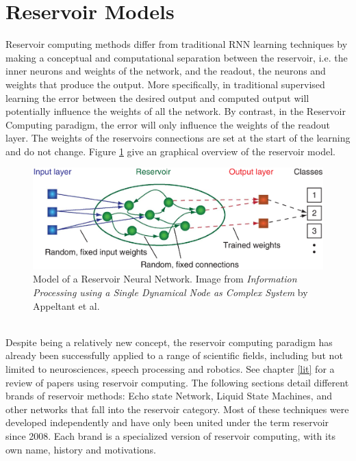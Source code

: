 \documentclass[12pt,oneside]{CUNY_CS_PhD}
\begin{document}
\section{Reservoir Models}
Reservoir computing methods differ from traditional RNN learning techniques by making a conceptual  and computational separation between the reservoir, i.e. the inner neurons and weights of the network, and the readout, the neurons and weights that produce the output. More specifically, in traditional supervised learning the error between the desired output and computed output will potentially influence the weights of all the network. By contrast, in the Reservoir Computing paradigm, the error will only influence the weights of the readout layer. The weights of the reservoirs connections are set at the start of the learning and do not change. Figure \ref{fig:reservoir} give an graphical overview of the reservoir model.
\begin{figure}[!htbp]
\centering
\includegraphics[width=1.0\textwidth]{pictures/reservoir_network.png}
\caption{Model of a Reservoir Neural Network. Image from \textit{Information Processing using a Single Dynamical Node as Complex System} by Appeltant et al. \cite{appeltant2011information} }
\label{fig:reservoir}
\end{figure}\\
Despite being a relatively new concept, the reservoir computing paradigm has already been successfully applied to a range of scientific fields, including but not limited to neurosciences, speech processing and robotics. See chapter \ref{lit} for a review of papers using reservoir computing. The following sections detail different brands of reservoir methods: Echo state Network, Liquid State Machines, and other networks that fall into the reservoir category. Most of these techniques were developed independently and have only been united under the term reservoir since 2008. Each brand is a specialized version of reservoir computing, with its own name, history and motivations.

\end{document}
